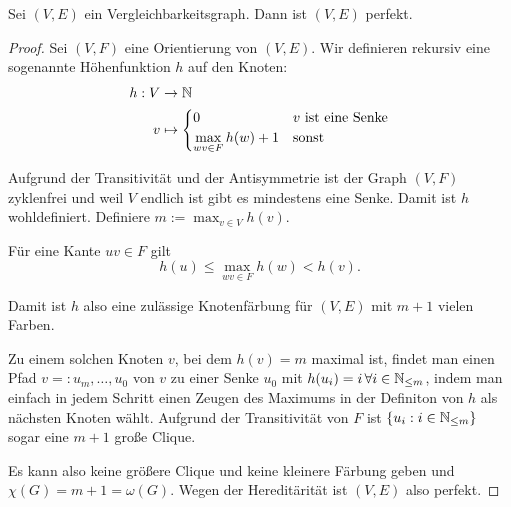 \documentclass[../main.tex]{subfiles}
\begin{document}
\begin{satz}
    Sei $(V, E)$ ein Vergleichbarkeitsgraph. Dann ist $(V, E)$ perfekt.
\end{satz}
\begin{proof}
    Sei $(V, F)$ eine Orientierung von $(V, E)$. Wir definieren rekursiv eine sogenannte Höhenfunktion $h$ auf den Knoten:
    \begin{align*}
        h : V &\to \mathbb{N} \\
        v &\mapsto \begin{cases}
            0 &v \text{ ist eine Senke}\\
            \max\limits_{wv \in F} h(w) + 1 &\text {sonst}
        \end{cases}
    \end{align*}
    
    Aufgrund der Transitivität und der Antisymmetrie ist der Graph $(V, F)$ zyklenfrei und weil $V$ endlich ist gibt es mindestens eine Senke. Damit ist $h$ wohldefiniert. Definiere $m := \max_{v \in V} h(v)$.

    Für eine Kante $uv \in F$ gilt $$h(u) \leq \max\limits_{wv \in F} h(w) < h(v).$$

    Damit ist $h$ also eine zulässige Knotenfärbung für $(V, E)$ mit $m + 1$ vielen Farben.
    
    Zu einem solchen Knoten $v$, bei dem $h(v) = m$ maximal ist, findet man einen Pfad $v =: u_m, \hdots, u_0$ von $v$ zu einer Senke $u_0$ mit $h(u_i) = i\, \forall i \in \mathbb{N}_{\leq m}$, indem man einfach in jedem Schritt einen Zeugen des Maximums in der Definiton von $h$ als nächsten Knoten wählt. Aufgrund der Transitivität von $F$ ist $\{u_i : i \in \mathbb{N}_{\leq m}\}$ sogar eine $m+1$ große Clique.
    
    Es kann also keine größere Clique und keine kleinere Färbung geben und $\chi(G) = m+1 = \omega(G)$. Wegen der Hereditärität ist $(V, E)$ also perfekt.
\end{proof}
\end{document}
